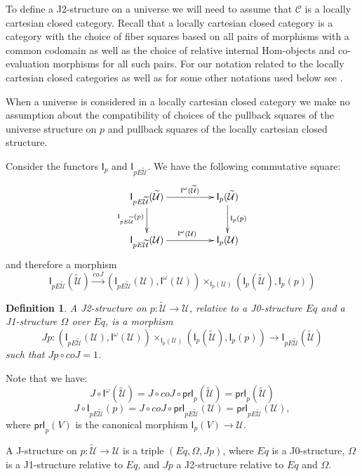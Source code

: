 \documentclass[12pt]{article}
\numberwithin{equation}{section}
\newenvironment{eq}{\begin{equation}}{\end{equation}}
\newtheorem{definition}[proposition]{Definition}
\newcommand{\sr}{\rightarrow}
\newcommand{\lr}{\longrightarrow}
\newcommand{\wt}{\widetilde}
\newcommand{\C}{{\mathcal C}}  %
\newcommand{\id}{1}            %
\newcommand{\U}{\mathcal{U}}
\newcommand{\I}{\mathsf{I}}
\newcommand{\prI}{\mathsf{prI}}
\begin{document}
To define a J2-structure on a universe we will need to assume that $\C$
is a locally cartesian closed category.  Recall that a locally cartesian closed
category is a category with the choice of fiber squares based on all pairs of
morphisms with a common codomain as well as the choice of relative internal
Hom-objects and co-evaluation morphisms for all such pairs. For our notation
related to the locally cartesian closed categories as well as for some other
notations used below see \cite{fromunivwithPiI,presheavesOb,fromunivwithPiII}.

When a universe is considered in a locally cartesian closed category we make no
assumption about the compatibility of choices of the pullback squares of the
universe structure on $p$ and pullback squares of the locally cartesian closed
structure.

Consider the functors $\I_{p}$ and $\I_{pE\wt{\U}}$. We have the following
commutative square:
%
\begin{eq}\label{2010.sq1}
\begin{xy}
          \xymatrix@C=4pc{ \I_{pE\wt{\U}}(\wt{\U}) \ar[r]^-{\I^{\omega}(\wt{\U})}
            \ar[d]_{\I_{pE\wt{\U}}(p)} & \I_p(\wt{\U})
            \ar[d]^{\I_p(p)}\\ \I_{pE\wt{\U}}(\U) \ar[r]^{\I^{\omega}(\U)} & \I_p(\U) }
\end{xy}
\end{eq}%
%
and therefore a morphism
%
$$\I_{pE\wt{\U}}(\wt{\U}) \stackrel{coJ}{\lr} (\I_{pE\wt{\U}}(\U), \I^{\omega}(\U))
\times_{\I_p(\U)} (\I_p(\wt{\U}), \I_p(p))
$$
%
\begin{definition}
\label{2015.03.27.def6} A {\em J2-structure} on $p:\wt{\U}\sr \U$, relative to a J0-structure $Eq$
and a J1-structure $\Omega$ over $Eq$, is a morphism
%
$$ Jp:( \I_{pE\wt{\U}}(\U), \I^{\omega}(\U))\times_{\I_p(\U)} (\I_p(\wt{\U}), \I_p(p))\sr
\I_{pE\wt{\U}}(\wt{\U}) $$
%
such that $Jp\circ coJ = \id$.
\end{definition}
%
Note that we have:
%
\begin{eq}
\label{2015.04.04.eq1} J\circ \I^{\omega}(\wt{\U})=J\circ coJ\circ
\prI_p(\wt{\U})=\prI_{p}(\wt{\U})
\end{eq}%
%
\begin{eq}
\label{2015.04.04.eq2} J\circ \I_{pE\wt{\U}}(p)=J\circ coJ\circ
\prI_{pE\wt{\U}}(\U)=\prI_{pE\wt{\U}}(\U),
\end{eq}%
%
where $\prI_p(V)$ is the canonical morphism $\I_p(V)\sr \U$.

A J-structure on $p:\wt{\U}\sr \U$ is a triple $(Eq,\Omega,Jp)$, where $Eq$ is a J0-structure,
$\Omega$ is a J1-structure relative to $Eq$, and $Jp$ a J2-structure relative to
$Eq$ and $\Omega$.
\end{document}
